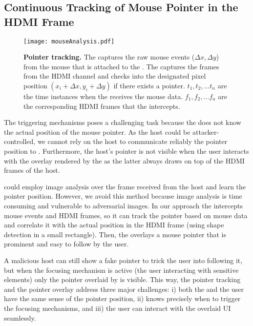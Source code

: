 \subsection{Continuous Tracking of Mouse Pointer in the HDMI Frame}
\label{sec:systemDesign:analysis}


\begin{figure}[t]
\centering
\texttt{[image: mouseAnalysis.pdf]}
\caption{\textbf{Pointer tracking.} \one The \device captures the raw mouse events ($\Delta x, \Delta y$) from the mouse that is attached to the \device. \two The \device captures the frames from the HDMI channel and checks into the designated pixel position $(x_i + \Delta x, y_i + \Delta y)$ if there exists a pointer. $t_1, t_2,\ldots t_n$ are the time instances when the \device receives the mouse data. $f_1, f_2,\ldots f_n$ are the corresponding HDMI frames that the \device intercepts.}
\spacesave
\label{fig:mouseAnalysis}
\centering
\end{figure}

The triggering mechanisms poses a challenging task because the \device does not know the actual position of the mouse pointer. As the host could be attacker-controlled, we cannot rely on the host to communicate reliably the pointer position to \device. Furthermore, the host's pointer is not visible when the user interacts with the overlay rendered by the \device as the latter always draws on top of the HDMI frames of the host. 

\device could employ image analysis over the frame received from the host and learn the pointer position. However, we avoid this method because image analysis is time consuming and vulnerable to adversarial images. In our approach the \device intercepts mouse events and HDMI frames, so it can track the pointer based on mouse data and correlate it with the actual position in the HDMI frame (using shape detection in a small rectangle). Then, the \device overlays a mouse pointer that is prominent and easy to follow by the user. 

A malicious host can still show a fake pointer to trick the user into following it, but when the focusing mechanism is active (the user interacting with sensitive elements) only the pointer overlaid by \device is visible. This way, the pointer tracking and the pointer overlay address three major challenges: i) both the \device and the user have the same sense of the pointer position, ii) \device knows precisely when to trigger the focusing mechanisms, and iii) the user can interact with the overlaid UI seamlessly. 


